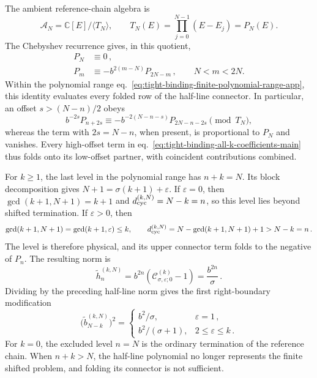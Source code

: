\documentclass[a4paper,11pt]{article}
\theoremstyle{definition}
\theoremstyle{remark}
\newcommand{\CC}{\mathbb C}
\newcommand{\cA}{\mathcal A}
\newcommand{\thh}{\widetilde h}
\begin{document}
The ambient reference-chain algebra is
\begin{equation}
   \cA_N=\CC[E]/\langle T_N\rangle,
   \qquad
   T_N(E)=\prod_{j=0}^{N-1}(E-E_j)=P_N(E).
   \label{eq:tight-binding-ambient-quotient-app}
\end{equation}
The Chebyshev recurrence gives, in this quotient,
\begin{equation}
\begin{aligned}
   P_N&\equiv0\,,\\
   P_m&\equiv-b^{2(m-N)}P_{2N-m}\,,
   \qquad N<m<2N.
\end{aligned}
   \label{eq:tight-binding-terminal-fold-app}
\end{equation}
Within the polynomial range
eq.~\eqref{eq:tight-binding-finite-polynomial-range-app}, this identity
evaluates every folded row of the half-line connector.  In particular,
an offset $s>(N-n)/2$ obeys
\begin{equation}
   b^{-2s}P_{n+2s}
   \equiv
   -b^{-2(N-n-s)}P_{2N-n-2s}
   \pmod{T_N},
   \label{eq:tight-binding-offset-fold-app}
\end{equation}
whereas the term with $2s=N-n$, when present, is proportional to $P_N$
and vanishes.  Every high-offset term in
eq.~\eqref{eq:tight-binding-all-k-coefficients-main} thus folds onto its
low-offset partner, with coincident contributions combined.

For $k\ge1$, the last level in the polynomial range has $n+k=N$.
Its block decomposition gives
$N+1=\sigma(k+1)+\varepsilon$.  If $\varepsilon=0$, then
$\gcd(k+1,N+1)=k+1$ and
$d_{\rm cyc}^{(k,N)}=N-k=n$, so this level lies beyond shifted
termination.  If $\varepsilon>0$, then
\begin{equation}
   \gcd(k+1,N+1)=\gcd(k+1,\varepsilon)\le k,
   \qquad
   d_{\rm cyc}^{(k,N)}
   =N-\gcd(k+1,N+1)+1>N-k=n\,.
\end{equation}
The level is therefore physical, and its upper connector term folds to the negative of $P_n$.  The resulting norm is 
\begin{equation}
   \thh_n^{(k,N)}
   =
   b^{2n}\left(
      \mathcal C_{\sigma,\varepsilon;0}^{(k)}-1
   \right)
   =\frac{b^{2n}}{\sigma}\,.
   \label{eq:tight-binding-first-terminal-norm-app}
\end{equation}
Dividing by the preceding half-line norm gives the first right-boundary
modification
\begin{equation}
   \bigl(\widetilde b_{N-k}^{(k,N)}\bigr)^2
   =
   \begin{cases}
      b^2/\sigma,&\varepsilon=1\,,\\[2pt]
      b^2/(\sigma+1),&2\le\varepsilon\le k\,.
   \end{cases}
   \label{eq:tight-binding-first-terminal-hopping-app}
\end{equation}
For $k=0$, the excluded level $n=N$ is the ordinary termination of the
reference chain.  When $n+k>N$, the half-line polynomial no longer
represents the finite shifted problem, and folding its connector is not
sufficient.
\end{document}
